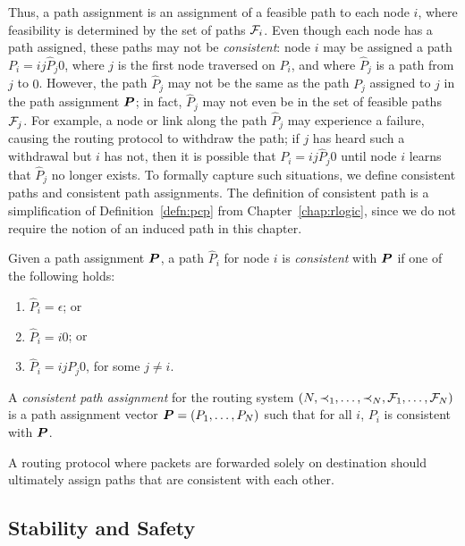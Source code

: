 Thus, a path assignment is an assignment of a feasible path to each node
$i$, where feasibility is determined by the set of paths $\mathcal{F}_i$.
Even though each node has a path assigned, these paths may
not be {\em consistent}: node $i$ may be assigned a path
$P_i = ij\hat{P}_j 0$, where $j$ is the first node traversed on $P_i$,
and where $\hat{P}_j$ is a path from $j$ to $0$.  However, the path
$\hat{P}_j$ may not be the same as the path $P_j$ assigned to $j$ in
the path assignment $\boldsymbol{P}$; in fact, $\hat{P}_j$ may not even be in
the set of feasible paths $\mathcal{F}_j$.  
For example, a node or link along the path $\hat{P}_j$ may experience a
failure, causing the routing protocol to withdraw the path; if $j$ has
heard such a withdrawal but $i$ has not, then it is possible that $P_i =
ij\hat{P}_j 0$ until node $i$ learns that  $\hat{P}_j$ no longer exists.
To formally capture such situations, we define consistent paths and
consistent path assignments.  The definition of consistent path is
a simplification of Definition~\ref{defn:pcp} from
Chapter~\ref{chap:rlogic}, since we do not require the notion of an
induced path in this chapter.

\begin{defn}
Given a path assignment $\boldsymbol{P}$, a path $\hat{P}_i$ for node $i$ is
{\em consistent} with $\boldsymbol{P}$ if one of the following holds:
\begin{enumerate}
\itemsep=-1pt
\item $\hat{P}_i = \epsilon$; or
\item $\hat{P}_i = i0$; or
\item $\hat{P}_i = i j P_j 0$, for some $j \neq i$.
\end{enumerate}
\end{defn}


\begin{defn}
\label{def:consistent}
A {\em consistent path assignment} for the routing system $(N, \prec_1,
\ldots, \prec_N, \mathcal{F}_1, \ldots, \mathcal{F}_N)$ is a path assignment vector $\boldsymbol{P}
= (P_1,\ldots,P_N)$ such that for all $i$, $P_i$ is consistent with
$\boldsymbol{P}$.
\end{defn}


A routing protocol where packets are forwarded solely
on destination should ultimately assign paths that are consistent with
each other.  

\subsection{Stability and Safety}

